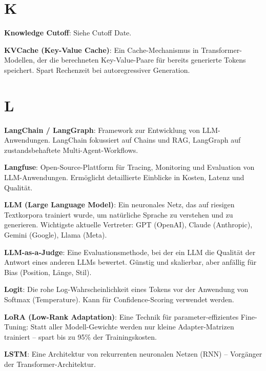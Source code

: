 \section{K}

\textbf{Knowledge Cutoff}\hspace{0pt}: Siehe Cutoff Date.

\textbf{KVCache (Key-Value Cache)}\hspace{0pt}: Ein Cache-Mechanismus in Transformer-Modellen, der die berechneten Key-Value-Paare für bereits generierte Tokens speichert. Spart Rechenzeit bei autoregressiver Generation.

\section{L}

\textbf{LangChain / LangGraph}\hspace{0pt}: Framework zur Entwicklung von LLM-Anwendungen. LangChain fokussiert auf Chains und RAG, LangGraph auf zustandsbehaftete Multi-Agent-Workflows.

\textbf{Langfuse}\hspace{0pt}: Open-Source-Plattform für Tracing, Monitoring und Evaluation von LLM-Anwendungen. Ermöglicht detaillierte Einblicke in Kosten, Latenz und Qualität.

\textbf{LLM (Large Language Model)}\hspace{0pt}: Ein neuronales Netz, das auf riesigen Textkorpora trainiert wurde, um natürliche Sprache zu verstehen und zu generieren. Wichtigste aktuelle Vertreter: GPT (OpenAI), Claude (Anthropic), Gemini (Google), Llama (Meta).

\textbf{LLM-as-a-Judge}\hspace{0pt}: Eine Evaluationsmethode, bei der ein LLM die Qualität der Antwort eines anderen LLMs bewertet. Günstig und skalierbar, aber anfällig für Bias (Position, Länge, Stil).

\textbf{Logit}\hspace{0pt}: Die rohe Log-Wahrscheinlichkeit eines Tokens vor der Anwendung von Softmax (Temperature). Kann für Confidence-Scoring verwendet werden.

\textbf{LoRA (Low-Rank Adaptation)}\hspace{0pt}: Eine Technik für parameter-effizientes Fine-Tuning: Statt aller Modell-Gewichte werden nur kleine Adapter-Matrizen trainiert -- spart bis zu 95\% der Trainingskosten.

\textbf{LSTM}\hspace{0pt}: Eine Architektur von rekurrenten neuronalen Netzen (RNN) -- Vorgänger der Transformer-Architektur.

